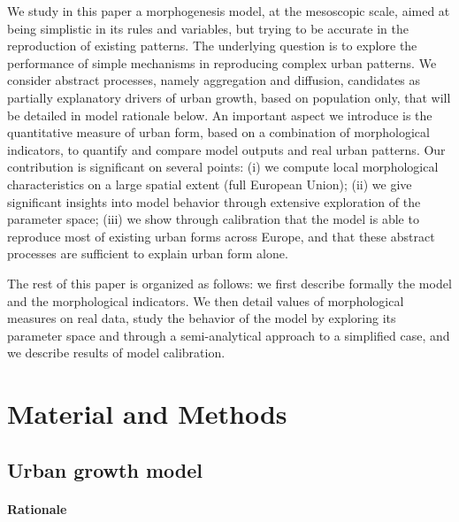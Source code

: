 \documentclass[10pt,letterpaper,draft]{article}
\begin{document}
We study in this paper a morphogenesis model, at the mesoscopic scale, aimed at being simplistic in its rules and variables, but trying to be accurate in the reproduction of existing patterns. The underlying question is to explore the performance of simple mechanisms in reproducing complex urban patterns. We consider abstract processes, namely aggregation and diffusion, candidates as partially explanatory drivers of urban growth, based on population only, that will be detailed in model rationale below. An important aspect we introduce is the quantitative measure of urban form, based on a combination of morphological indicators, to quantify and compare model outputs and real urban patterns. Our contribution is significant on several points: (i) we compute local morphological characteristics on a large spatial extent (full European Union); (ii) we give significant insights into model behavior through extensive exploration of the parameter space; (iii) we show through calibration that the model is able to reproduce most of existing urban forms across Europe, and that these abstract processes are sufficient to explain urban form alone.


The rest of this paper is organized as follows: we first describe formally the model and the morphological indicators. We then detail values of morphological measures on real data, study the behavior of the model by exploring its parameter space and through a semi-analytical approach to a simplified case, and we describe results of model calibration.


\section*{Material and Methods}


\subsection*{Urban growth model}



\paragraph*{Rationale}
\end{document}
